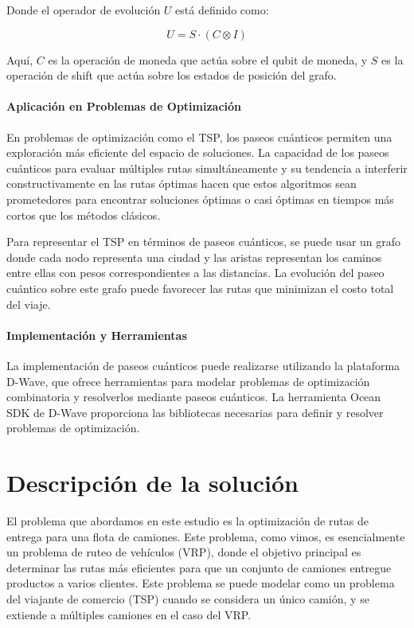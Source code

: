 \documentclass[11pt,a4paper,spanish]{book}
\begin{document}
Donde el operador de evolución \(U\) está definido como:

\[
U = S \cdot (C \otimes I)
\]

Aquí, \(C\) es la operación de moneda que actúa sobre el qubit de moneda, y \(S\) es la operación de shift que actúa sobre los estados de posición del grafo.

\subsubsection{Aplicación en Problemas de Optimización}

En problemas de optimización como el TSP, los paseos cuánticos permiten una exploración más eficiente del espacio de soluciones. La capacidad de los paseos cuánticos para evaluar múltiples rutas simultáneamente y su tendencia a interferir constructivamente en las rutas óptimas hacen que estos algoritmos sean prometedores para encontrar soluciones óptimas o casi óptimas en tiempos más cortos que los métodos clásicos.

Para representar el TSP en términos de paseos cuánticos, se puede usar un grafo donde cada nodo representa una ciudad y las aristas representan los caminos entre ellas con pesos correspondientes a las distancias. La evolución del paseo cuántico sobre este grafo puede favorecer las rutas que minimizan el costo total del viaje.

\subsubsection{Implementación y Herramientas}

La implementación de paseos cuánticos puede realizarse utilizando la plataforma D-Wave, que ofrece herramientas para modelar problemas de optimización combinatoria y resolverlos mediante paseos cuánticos. La herramienta Ocean SDK de D-Wave proporciona las bibliotecas necesarias para definir y resolver problemas de optimización.


\chapter{Descripción de la solución}

El problema que abordamos en este estudio es la optimización de rutas de entrega para una flota de camiones. Este problema, como vimos, es esencialmente un problema de ruteo de vehículos (VRP), donde el objetivo principal es determinar las rutas más eficientes para que un conjunto de camiones entregue productos a varios clientes. Este problema se puede modelar como un problema del viajante de comercio (TSP) cuando se considera un único camión, y se extiende a múltiples camiones en el caso del VRP.
\end{document}
